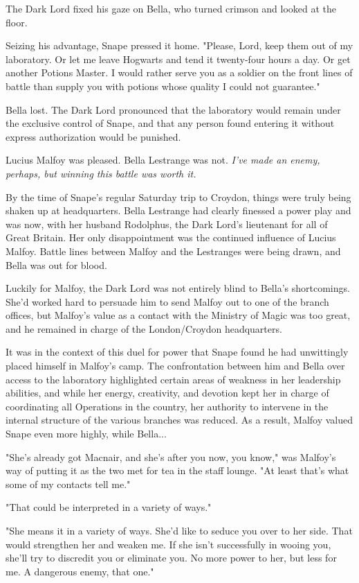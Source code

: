 \documentclass[a4paper,11pt]{article}
\begin{document}
The Dark Lord fixed his gaze on Bella, who turned crimson and looked at the floor.

Seizing his advantage, Snape pressed it home. "Please, Lord, keep them out of my laboratory. Or let me leave Hogwarts and tend it twenty-four hours a day. Or get another Potions Master. I would rather serve you as a soldier on the front lines of battle than supply you with potions whose quality I could not guarantee."

Bella lost. The Dark Lord pronounced that the laboratory would remain under the exclusive control of Snape, and that any person found entering it without express authorization would be punished.

Lucius Malfoy was pleased. Bella Lestrange was not. \emph{I've made an enemy, perhaps, but winning this battle was worth it.}

By the time of Snape's regular Saturday trip to Croydon, things were truly being shaken up at headquarters. Bella Lestrange had clearly finessed a power play and was now, with her husband Rodolphus, the Dark Lord's lieutenant for all of Great Britain. Her only disappointment was the continued influence of Lucius Malfoy. Battle lines between Malfoy and the Lestranges were being drawn, and Bella was out for blood.

Luckily for Malfoy, the Dark Lord was not entirely blind to Bella's shortcomings. She'd worked hard to persuade him to send Malfoy out to one of the branch offices, but Malfoy's value as a contact with the Ministry of Magic was too great, and he remained in charge of the London/Croydon headquarters.

It was in the context of this duel for power that Snape found he had unwittingly placed himself in Malfoy's camp. The confrontation between him and Bella over access to the laboratory highlighted certain areas of weakness in her leadership abilities, and while her energy, creativity, and devotion kept her in charge of coordinating all Operations in the country, her authority to intervene in the internal structure of the various branches was reduced. As a result, Malfoy valued Snape even more highly, while Bella...

"She's already got Macnair, and she's after you now, you know," was Malfoy's way of putting it as the two met for tea in the staff lounge. "At least that's what some of my contacts tell me."

"That could be interpreted in a variety of ways."

"She means it in a variety of ways. She'd like to seduce you over to her side. That would strengthen her and weaken me. If she isn't successfully in wooing you, she'll try to discredit you or eliminate you. No more power to her, but less for me. A dangerous enemy, that one."
\end{document}
